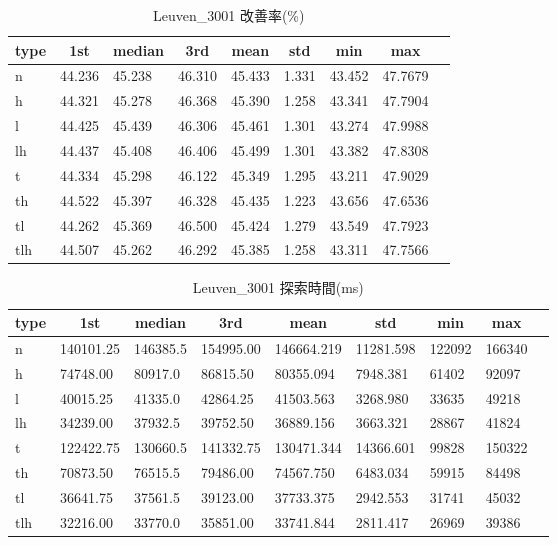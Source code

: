 \begin{table}[htbp]
    \caption{Leuven\_3001 改善率(\%)}
    \begin{tabular}{|l|l|l|l|l|l|l|l|l|}\hline
    \multicolumn{1}{|c|}{\textbf{type}}
    &\multicolumn{1}{|c|}{\textbf{1st}}
    &\multicolumn{1}{c|}{\textbf{median}}
    &\multicolumn{1}{c|}{\textbf{3rd}}
    &\multicolumn{1}{c|}{\textbf{mean}}
    &\multicolumn{1}{c|}{\textbf{std}}
    &\multicolumn{1}{c|}{\textbf{min}}
    &\multicolumn{1}{c|}{\textbf{max}}\\\hline
	n & 44.236 & 45.238 & 46.310 & 45.433 & 1.331 & 43.452 & 47.7679\\\hline
	h & 44.321 & 45.278 & 46.368 & 45.390 & 1.258 & 43.341 & 47.7904\\\hline
	l & 44.425 & 45.439 & 46.306 & 45.461 & 1.301 & 43.274 & 47.9988\\\hline
	lh & 44.437 & 45.408 & 46.406 & 45.499 & 1.301 & 43.382 & 47.8308\\\hline
	t & 44.334 & 45.298 & 46.122 & 45.349 & 1.295 & 43.211 & 47.9029\\\hline
	th & 44.522 & 45.397 & 46.328 & 45.435 & 1.223 & 43.656 & 47.6536\\\hline
	tl & 44.262 & 45.369 & 46.500 & 45.424 & 1.279 & 43.549 & 47.7923\\\hline
	tlh & 44.507 & 45.262 & 46.292 & 45.385 & 1.258 & 43.311 & 47.7566\\\hline
	\end{tabular}
\end{table}
\begin{table}[htbp]
    \caption{Leuven\_3001 探索時間(ms)}
    \begin{tabular}{|l|l|l|l|l|l|l|l|l|}\hline
    \multicolumn{1}{|c|}{\textbf{type}}
    &\multicolumn{1}{|c|}{\textbf{1st}}
    &\multicolumn{1}{c|}{\textbf{median}}
    &\multicolumn{1}{c|}{\textbf{3rd}}
    &\multicolumn{1}{c|}{\textbf{mean}}
    &\multicolumn{1}{c|}{\textbf{std}}
    &\multicolumn{1}{c|}{\textbf{min}}
    &\multicolumn{1}{c|}{\textbf{max}}\\\hline
	n & 140101.25 & 146385.5 & 154995.00 & 146664.219 & 11281.598 & 122092 & 166340\\\hline
	h & 74748.00 & 80917.0 & 86815.50 & 80355.094 & 7948.381 & 61402 & 92097\\\hline
	l & 40015.25 & 41335.0 & 42864.25 & 41503.563 & 3268.980 & 33635 & 49218\\\hline
	lh & 34239.00 & 37932.5 & 39752.50 & 36889.156 & 3663.321 & 28867 & 41824\\\hline
	t & 122422.75 & 130660.5 & 141332.75 & 130471.344 & 14366.601 & 99828 & 150322\\\hline
	th & 70873.50 & 76515.5 & 79486.00 & 74567.750 & 6483.034 & 59915 & 84498\\\hline
	tl & 36641.75 & 37561.5 & 39123.00 & 37733.375 & 2942.553 & 31741 & 45032\\\hline
	tlh & 32216.00 & 33770.0 & 35851.00 & 33741.844 & 2811.417 & 26969 & 39386\\\hline
	\end{tabular}
\end{table}
